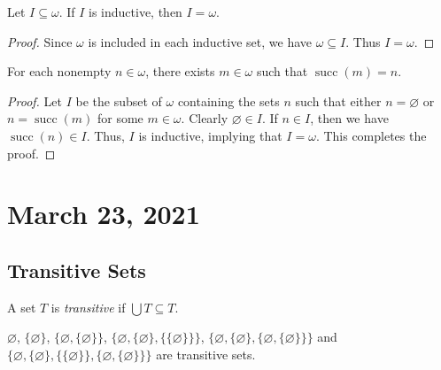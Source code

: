 \documentclass[11pt]{article}
\DeclareMathOperator{\suc}{succ}
\begin{document}
\begin{theorem}
  \label{thm:induction}
  Let $I \subseteq \omega$.
  If $I$ is inductive, then $I = \omega$.
\end{theorem}
\begin{proof}
  Since $\omega$ is included in each inductive set, we have $\omega \subseteq I$.
  Thus $I = \omega$.
\end{proof}

\begin{proposition}
  For each nonempty $n \in \omega$, there exists $m \in \omega$ such that $\suc(m) = n$.
\end{proposition}
\begin{proof}
  Let $I$ be the subset of $\omega$ containing the sets $n$ such that either $n = \varnothing$ or $n = \suc(m)$ for some $m \in \omega$.
  Clearly $\varnothing \in I$.
  If $n \in I$, then we have $\suc(n) \in I$.
  Thus, $I$ is inductive, implying that $I = \omega$.
  This completes the proof.
\end{proof}

\section{March 23, 2021}
\subsection{Transitive Sets}
\begin{definition}
  A set $T$ is \emph{transitive} if $\bigcup T \subseteq T$.
\end{definition}

\begin{example}
  $\varnothing$, $\{\varnothing\}$, $\{\varnothing, \{\varnothing\}\}$, $\{\varnothing, \{\varnothing\}, \{\{\varnothing\}\}\}$, $\{\varnothing, \{\varnothing\}, \{\varnothing, \{\varnothing\}\}\}$ and $\{\varnothing, \{\varnothing\}, \{\{\varnothing\}\}, \{\varnothing, \{\varnothing\}\}\}$ are transitive sets.
\end{example}
\end{document}
